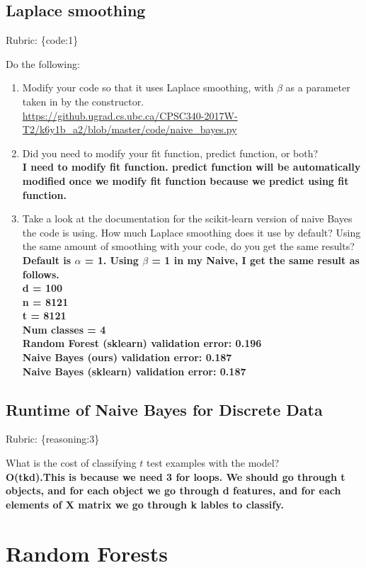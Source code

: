 \documentclass{article}
\def\blu#1{{\color{blu}#1}}
\def\gre#1{{\color{gre}#1}}
\def\enum#1{\begin{enumerate}#1\end{enumerate}}
\def\rubric#1{\gre{Rubric: \{#1\}}}{}
\begin{document}
\subsection{Laplace smoothing}
\rubric{code:1}

\blu{Do the following:}
\enum{
\item Modify your code so that it uses Laplace smoothing, with $\beta$
as a parameter taken in by the constructor.\\
\url{https://github.ugrad.cs.ubc.ca/CPSC340-2017W-T2/k6y1b\_a2/blob/master/code/naive_bayes.py}
\item Did you need to modify your fit function, predict function, or both?\\
\textbf{I need to modify fit function. predict function will be automatically modified once we modify fit function because we predict using fit function.}
\item Take a look at the documentation for the scikit-learn version of naive Bayes the code is using. How much Laplace smoothing does it use by default? Using the same amount of smoothing with your code, do you get the same results?\\
\textbf{Default is $\alpha$ = 1. Using $\beta$ = 1 in my Naive, I get the same result as follows.\\
	d = 100\\
	n = 8121\\
	t = 8121\\
	Num classes = 4\\
	Random Forest (sklearn) validation error: 0.196\\
	Naive Bayes (ours) validation error: 0.187\\
	Naive Bayes (sklearn) validation error: 0.187
}
}


\subsection{Runtime of Naive Bayes for Discrete Data}
\rubric{reasoning:3}

 \blu{What is the cost of classifying $t$ test examples with the model?}\\
\textbf{O(tkd).This is because we need 3 for loops. We should go through t objects, and for each object we go through d features, and for each elements of X matrix we go through k lables to classify.}


\section{Random Forests}
\end{document}
